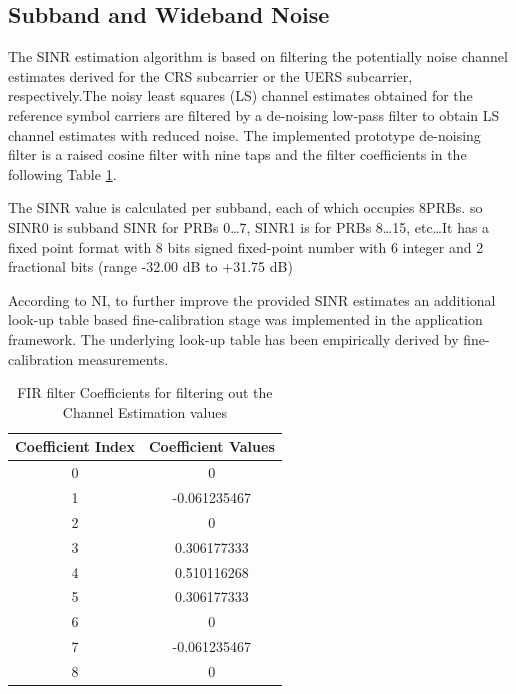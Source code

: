 \subsection{Subband and Wideband Noise}\label{ssec:SINR}

The SINR estimation algorithm is based on filtering the potentially noise channel estimates derived for the CRS subcarrier or the UERS subcarrier, respectively.The noisy least squares (LS) channel estimates obtained for the reference symbol carriers are filtered by a de-noising low-pass filter to obtain LS channel estimates with reduced noise. The implemented prototype de-noising filter is a raised cosine filter with nine taps and the filter coefficients in the following Table \ref{tab:LPFCoeff}.

The SINR value is calculated per subband, each of which occupies 8PRBs. so SINR0 is subband SINR for PRBs 0\ldots7, SINR1 is for PRBs 8\ldots15, etc\ldots It has a fixed point format with 8 bits signed fixed-point number with 6 integer and 2 fractional bits (range -32.00 \si{\dB} to +31.75 \si{\dB})

According to NI, to further improve the provided SINR estimates an additional look-up table based fine-calibration stage was implemented in the application framework. The underlying look-up table has been empirically derived by fine-calibration measurements.

\begin{table}[H]
    \begin{center}
        \begin{tabular}{|c|c|}
            \hline
            \textbf{Coefficient Index} & \textbf{Coefficient Values} \\ \hline
            0                          & 0                           \\ \hline
            1                          & -0.061235467                \\ \hline
            2                          & 0                           \\ \hline
            3                          & 0.306177333                 \\ \hline
            4                          & 0.510116268                 \\ \hline
            5                          & 0.306177333                 \\ \hline
            6                          & 0                           \\ \hline
            7                          & -0.061235467                \\ \hline
            8                          & 0                           \\ \hline
        \end{tabular}
    \end{center}
    \caption{FIR filter Coefficients for filtering out the Channel Estimation values}
    \label{tab:LPFCoeff}
\end{table}

